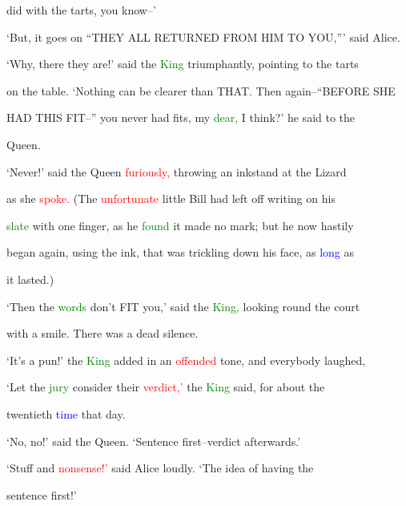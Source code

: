  did with the tarts, you know--’



 ‘But, it goes on “THEY ALL RETURNED FROM HIM TO YOU,”’ said Alice.



 ‘Why, there they are!’ said the \textcolor{green}{King} triumphantly, pointing to the tarts

 on the table. ‘Nothing can be clearer than THAT. Then again--“BEFORE SHE

 HAD THIS FIT--” you never had fits, my \textcolor{green}{dear,} I think?’ he said to the

 Queen.



 ‘Never!’ said the Queen \textcolor{red}{furiously,} throwing an inkstand at the Lizard

 as she \textcolor{red}{spoke.} (The \textcolor{red}{unfortunate} little Bill had left off writing on his

 \textcolor{green}{slate} with one finger, as he \textcolor{green}{found} it made no mark; but he now hastily

 began again, using the ink, that was trickling down his face, as \textcolor{blue}{long} as

 it lasted.)



 ‘Then the \textcolor{green}{words} don’t FIT you,’ said the \textcolor{green}{King,} looking round the \textcolor{BurntOrange}{court}

 with a \textcolor{BurntOrange}{smile.} There was a dead silence.



 ‘It’s a pun!’ the \textcolor{green}{King} added in an \textcolor{red}{offended} tone, and everybody \textcolor{BurntOrange}{laughed,}

 ‘Let the \textcolor{green}{jury} consider their \textcolor{red}{verdict,’} the \textcolor{green}{King} said, for about the

 twentieth \textcolor{blue}{time} that day.



 ‘No, no!’ said the Queen. \textcolor{BurntOrange}{‘Sentence} first--verdict afterwards.’



 ‘Stuff and \textcolor{red}{nonsense!’} said Alice loudly. ‘The idea of having the

 \textcolor{BurntOrange}{sentence} first!’




